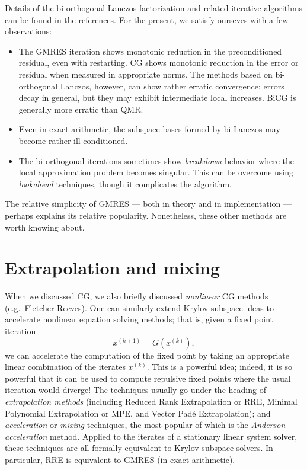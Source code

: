 \documentclass[12pt, leqno]{article} %
\begin{document}
Details of the bi-orthogonal Lanczos factorization and related
iterative algorithms can be found in the references.  For the present,
we satisfy ourseves with a few observations:
\begin{itemize}
\item
  The GMRES iteration shows monotonic reduction in the preconditioned
  residual, even with restarting.  CG shows monotonic reduction in the
  error or residual when measured in appropriate norms.  The methods
  based on bi-orthogonal Lanczos, however, can show rather erratic
  convergence; errors decay in general, but they may exhibit
  intermediate local increases.  BiCG is generally more erratic than
  QMR.
\item
  Even in exact arithmetic, the subspace bases formed by bi-Lanczos
  may become rather ill-conditioned.
\item
  The bi-orthogonal iterations sometimes show {\em breakdown} behavior
  where the local approximation problem becomes singular.  This can be
  overcome using {\em lookahead} techniques, though it complicates the
  algorithm.
\end{itemize}
The relative simplicity of GMRES --- both in theory and in implementation ---
perhaps explains its relative popularity.  Nonetheless, these other methods
are worth knowing about.

\section{Extrapolation and mixing}

When we discussed CG, we also briefly discussed {\em nonlinear} CG
methods (e.g.~Fletcher-Reeves).  One can similarly extend Krylov
subspace ideas to accelerate nonlinear equation solving methods;
that is, given a fixed point iteration
\[
  x^{(k+1)} = G(x^{(k)}),
\]
we can accelerate the computation of the fixed point by taking an
appropriate linear combination of the iterates $x^{(k)}$.  This is
a powerful idea; indeed, it is so powerful that it can be used to
compute repulsive fixed points where the usual iteration would
diverge!  The techniques usually go under the heading of
{\em extrapolation methods} (including Reduced Rank Extrapolation or RRE,
Minimal Polynomial Extrapolation or MPE, and Vector Pad\'e Extrapolation);
and {\em acceleration} or {\em mixing} techniques, the most popular of
which is the {\em Anderson acceleration} method.  Applied to the iterates
of a stationary linear system solver, these techniques are all formally
equivalent to Krylov subspace solvers.  In particular, RRE is equivalent
to GMRES (in exact arithmetic).
\end{document}
